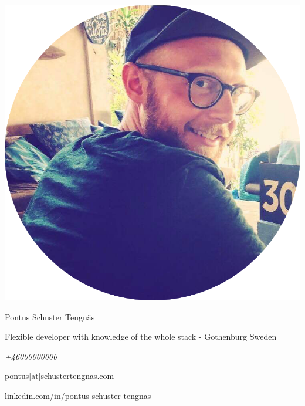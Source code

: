 \begin{minipage}{0.4\textwidth}
  \includegraphics[width=\linewidth]{../img/me.png}
\end{minipage}
\hspace{1.0cm}\begin{minipage}{0.5\textwidth}
  {\Large Pontus Schuster Tengnäs}

  Flexible developer with knowledge of the whole stack - Gothenburg Sweden
  \newline
  \newline
  {\itshape
  +46000000000

  pontus[at]schustertengnas.com

  linkedin.com/in/pontus-schuster-tengnas}

\end{minipage}
